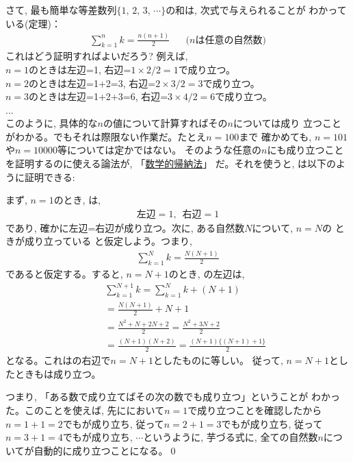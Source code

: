 さて, 最も簡単な等差数列$\{1,\,2,\,3,\,\cdots\}$の和は, 次式で与えられることが
わかっている(定理)：
\begin{eqnarray}
\sum_{k=1}^n k=\frac{n(n+1)}{2}\quad\,\,\,\,\text{($n$は任意の自然数)}\label{eq:sumk}
\end{eqnarray}
これはどう証明すればよいだろう? 例えば, \\
$n=1$のときは左辺=1, 右辺=$1\times2/2=1$で成り立つ。\\
$n=2$のときは左辺=1+2=3, 右辺=$2\times3/2=3$で成り立つ。\\
$n=3$のときは左辺=1+2+3=6, 右辺=$3\times4/2=6$で成り立つ。\\
...\\
このように, 具体的な$n$の値について計算すればその$n$については成り
立つことがわかる。でもそれは際限ない作業だ。たとえ$n=100$まで
確かめても, $n=101$や$n=10000$等については定かではない。
そのような任意の$n$にも成り立つことを証明するのに使える論法が, 
「\underline{数学的帰納法}」
だ。それを使うと, は以下のように証明できる:\hv

まず, $n=1$のとき, は, 
\begin{eqnarray}
\text{左辺}=1, \,\,\,\text{右辺}=1\label{eq:sumk1}
\end{eqnarray}
であり, 確かに左辺=右辺が成り立つ。次に, ある自然数$N$について, $n=N$の
ときが成り立っている
と仮定しよう。つまり, 
\begin{eqnarray}
\sum_{k=1}^N k=\frac{N(N+1)}{2}\label{eq:sumk_1}
\end{eqnarray}
であると仮定する。すると, $n=N+1$のとき, の左辺は, 
\begin{eqnarray}
&&\sum_{k=1}^{N+1} k=\sum_{k=1}^{N} k+(N+1)\label{eq:sumk_4}\\
&&=\frac{N(N+1)}{2}+N+1\label{eq:sumk_5}\\
&&=\frac{N^2+N+2N+2}{2}=\frac{N^2+3N+2}{2}\nonumber\\
&&=\frac{(N+1)(N+2)}{2}=\frac{(N+1)\{(N+1)+1\}}{2}
\end{eqnarray}
となる。これはの右辺で$n=N+1$としたものに等しい。
従って, $n=N+1$としたときもは成り立つ。

つまり, 「ある数で成り立てばその次の数でも成り立つ」ということが
わかった。このことを使えば, 先ににおいて$n=1$で成り立つことを確認したから
$n=1+1=2$でもが成り立ち, 従って$n=2+1=3$でもが成り立ち, 
従って$n=3+1=4$でもが成り立ち, $\cdots$というように, 芋づる式に, 
全ての自然数$n$についてが自動的に成り立つことになる。\qed
\vspace{0.2cm}

